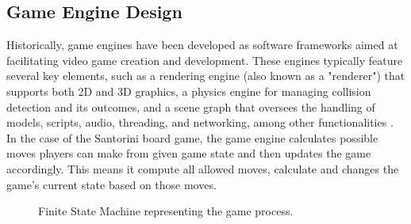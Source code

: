 \documentclass{telkomnika}
\begin{document}
\subsection{Game Engine Design}
Historically, game engines have been developed as software frameworks aimed at facilitating video game creation and development. These engines typically feature several key elements, such as a rendering engine (also known as a "renderer") that supports both 2D and 3D graphics, a physics engine for managing collision detection and its outcomes, and a scene graph that oversees the handling of models, scripts, audio, threading, and networking, among other functionalities \cite{Wang2018}. In the case of the Santorini board game, the game engine calculates possible moves players can make from given game state and then updates the game accordingly. This means it compute all allowed moves, calculate and changes the game's current state based on those moves. 
\begin{figure}[!ht]
\centering
{}
\caption{Finite State Machine representing the game process.}
\label{fig:game-fsm}
\end{figure}
\end{document}
